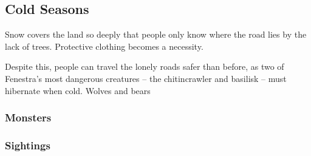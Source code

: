 \bigLine
\begin{multicols}{2}

\subsection{Cold Seasons}

Snow covers the land so deeply that people only know where the road lies by the lack of trees.
Protective clothing becomes a necessity.

Despite this, people can travel the lonely roads safer than before, as two of Fenestra's most dangerous creatures -- the chitincrawler and basilisk -- must hibernate when cold.
Wolves and bears 

\encColdVillages

\encColdEdge

\encColdForest

\subsubsection*{Monsters}

\begin{multicols}{2}
\setcounter{enc}{1}
\begin{dlist}
\end{dlist}

\subsubsection*{Sightings}

\setcounter{track}{1}
\begin{dlist}
\end{dlist}

\end{multicols}

\end{multicols}

\bigLine

